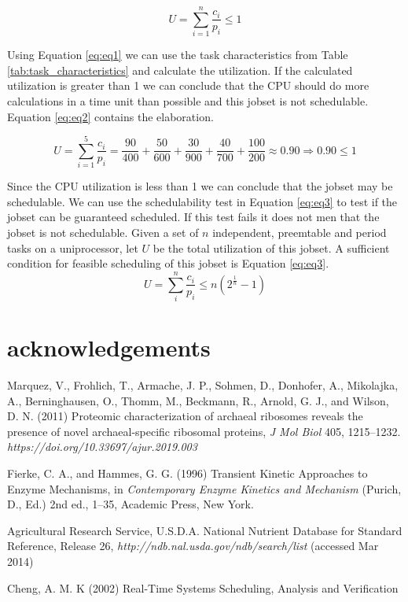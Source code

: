 \documentclass[10pt]{article}
\begin{document}
\begin{equation}
    U = \sum_{i=1}^{n} \frac{c_i}{p_i} \leq 1
    \label{eq:eq1}
\end{equation}

Using Equation \ref{eq:eq1} we can use the task characteristics from Table \ref{tab:task_characteristics} and calculate the utilization. If the calculated utilization is greater than 1 we can conclude that the CPU should do more calculations in a time unit than possible and this jobset is not schedulable.
Equation \ref{eq:eq2} contains the elaboration.

\begin{equation}
    U = \sum_{i=1}^{5} \frac{c_i}{p_i} = \frac{90}{400} + \frac{50}{600} + \frac{30}{900} + \frac{40}{700} + \frac{100}{200} \approx 0.90 \Rightarrow 0.90 \leq 1
    \label{eq:eq2}
\end{equation}

Since the CPU utilization is less than 1 we can conclude that the jobset may be schedulable.
We can use the schedulability test in Equation \ref{eq:eq3} to test if the jobset can be guaranteed scheduled.
If this test fails it does not men that the jobset is not schedulable.
Given a set of $n$ independent, preemtable and period tasks on a uniprocessor, let $U$ be the total utilization of this jobset.
A sufficient condition for feasible scheduling of this jobset is Equation \ref{eq:eq3}.
\begin{equation}
    U = \sum_{i}^{n} \frac{c_i}{p_i} \leq n(2^{\frac{1}{n}} - 1)
    \label{eq:eq3}
\end{equation}

\section*{acknowledgements}

\begin{thebibliography}{9} %

 Marquez, V., Frohlich, T., Armache, J. P., Sohmen, D., Donhofer, A., Mikolajka, A., Berninghausen, O., Thomm, M., Beckmann, R., Arnold, G. J., and Wilson, D. N. (2011) Proteomic characterization of archaeal ribosomes reveals the presence of novel archaeal-specific ribosomal proteins, \textit{J Mol Biol} 405, 1215--1232. \textit {https://doi.org/10.33697/ajur.2019.003}


 Fierke, C. A., and Hammes, G. G. (1996) Transient Kinetic Approaches to Enzyme Mechanisms, in \textit{Contemporary Enzyme Kinetics and Mechanism} (Purich, D., Ed.) 2nd ed., 1--35, Academic Press, New York.

 Agricultural Research Service, U.S.D.A. National Nutrient Database for Standard Reference, Release 26, \textit{http://ndb.nal.usda.gov/ndb/search/list} (accessed Mar 2014)

 Cheng, A. M. K (2002) Real-Time Systems Scheduling, Analysis and Verification
\end{thebibliography}
\end{document}
